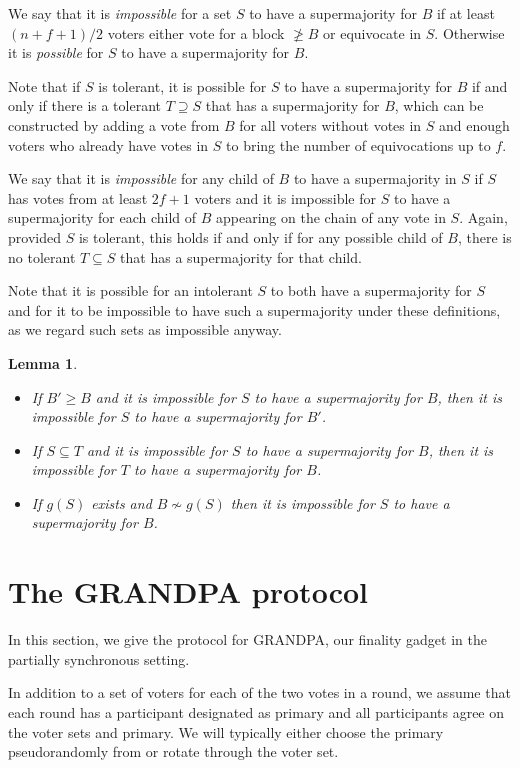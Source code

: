 \documentclass{article}
\newtheorem{lemma}[theorem]{Lemma}
\begin{document}
We say that it is {\em impossible} for a set $S$ to have a supermajority for $B$ if at least $(n+f+1)/2$ voters either vote for a block $\not \geq B$ or equivocate in $S$. Otherwise it is {\em possible} for $S$ to have a supermajority for $B$.

Note that if $S$ is tolerant, it is possible for $S$ to have a supermajority for $B$ if and only if there is a tolerant $T \supseteq S$ that has a supermajority for $B$, which can be constructed by adding a vote from $B$ for all voters without votes in $S$ and enough voters who already have votes in $S$ to bring the number of equivocations up to $f$.

We say that it is {\em impossible} for any child of $B$ to have a supermajority in $S$ if $S$ has votes from at least $2f+1$ voters and it is impossible for $S$ to have a supermajority for each child of $B$ appearing on the chain of any vote in $S$.
Again, provided $S$ is tolerant, this holds if and only if for any possible child of $B$, there is no tolerant $T \subseteq S$ that has a supermajority for that child.

Note that it is possible for an intolerant $S$ to both have a supermajority for $S$ and for it to be impossible to have such a supermajority under these definitions, as we regard such sets as impossible anyway.

\begin{lemma} \label{lem:impossible}
\begin{itemize}
\item[(i)] If $B' \geq B$ and it is impossible for $S$ to have a supermajority for $B$, then it is impossible for $S$ to have a supermajority for $B'$.
\item[(ii)] If $S \subseteq T$ and it is impossible for $S$ to have a supermajority for $B$, then it is impossible for $T$ to have a supermajority for $B$.
\item[(iii)] If $g(S)$ exists and $B \nsim g(S)$ then it is impossible for $S$ to have a supermajority for $B$.
\end{itemize}
\end{lemma}

\section{The GRANDPA protocol}

In this section, we give the protocol for GRANDPA, our finality gadget in the partially synchronous setting.


In addition to a set of voters for each of the two votes in a round, we assume that each round has a participant designated as primary and all participants agree on the voter sets and primary. We will typically either choose the primary pseudorandomly from or rotate through the voter set.
\end{document}
